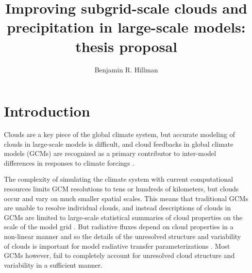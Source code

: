 \documentclass[letter]{article}
\author{Benjamin R. Hillman}
\title{Improving subgrid-scale clouds and precipitation in large-scale models: thesis proposal}
\begin{document}
\maketitle
\section{Introduction}

Clouds are a key piece of the global climate system, but accurate modeling of clouds in large-scale models is difficult, and cloud feedbacks in global climate models (GCMs) are recognized as a primary contributor to inter-model differences in responses to climate forcings \citep[e.g.,][]{cess_et_al_1990,bony_and_dufresne_2005,williams_and_webb_2009,medeiros_et_al_2008}.

The complexity of simulating the climate system with current computational resources limits GCM resolutions to tens or hundreds of kilometers, but clouds occur and vary on much smaller spatial scales. This means that traditional GCMs are unable to resolve individual clouds, and instead descriptions of clouds in GCMs are limited to large-scale statistical summaries of cloud properties on the scale of the model grid \citep{randall_et_al_2003}. But radiative fluxes depend on cloud properties in a non-linear manner and so the details of the unresolved structure and variability of clouds is important for model radiative transfer parameterizations \citep[e.g.,][]{barker_et_al_1999}. Most GCMs however, fail to completely account for unresolved cloud structure and variability in a sufficient manner.
\end{document}
